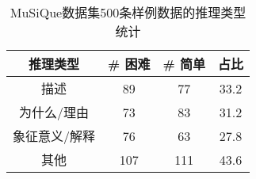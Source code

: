 \begin{table}[htbp]
    \centering
    \caption{MuSiQue数据集500条样例数据的推理类型统计}
    \label{tab:2-6}
    \begin{tabular}{cccc}
        \hline
        推理类型 & \# 困难 & \# 简单 & 占比 \\
        \hline
        描述 & 89 & 77 & 33.2  \\
        为什么/理由 & 73 & 83 & 31.2  \\
        象征意义/解释 & 76 & 63 & 27.8  \\
        其他 & 107 & 111 & 43.6  \\
        \hline
    \end{tabular}
\end{table}

